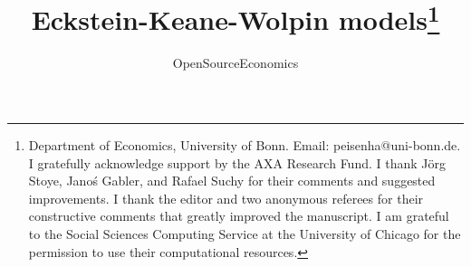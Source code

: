
\title{Eckstein-Keane-Wolpin models\thanks{Department of Economics, University of Bonn. Email: peisenha@uni-bonn.de. I gratefully acknowledge support by the AXA Research Fund. I thank J{\"o}rg Stoye, Jano\'{s} Gabler, and Rafael Suchy for their comments and suggested improvements. I thank the editor and two anonymous referees for their constructive comments that greatly improved the manuscript. I am grateful to the Social Sciences Computing Service at the University of Chicago for the permission to use their computational resources.}}
\author{OpenSourceEconomics}
\date{}
